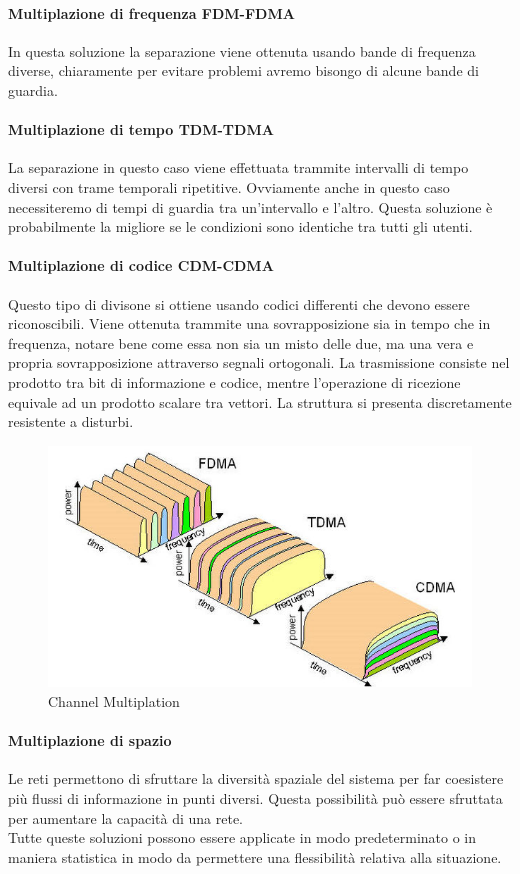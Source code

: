 \documentclass[12pt]{article}
\begin{document}
\paragraph{Multiplazione di frequenza FDM-FDMA}
In questa soluzione la separazione viene ottenuta usando bande di frequenza diverse, chiaramente per evitare problemi avremo bisongo di alcune bande di guardia.
\paragraph{Multiplazione di tempo TDM-TDMA}
La separazione in questo caso viene effettuata trammite intervalli di tempo diversi con trame temporali ripetitive. Ovviamente anche in questo caso necessiteremo di tempi di guardia tra un'intervallo e l'altro. Questa soluzione è probabilmente la migliore se le condizioni sono identiche tra tutti gli utenti.
\paragraph{Multiplazione di codice CDM-CDMA}
Questo tipo di divisone si ottiene usando codici differenti che devono essere riconoscibili. Viene ottenuta trammite una sovrapposizione sia in tempo che in frequenza, notare bene come essa non sia un misto delle due, ma una vera e propria sovrapposizione attraverso segnali ortogonali. La trasmissione consiste nel prodotto tra bit di informazione e codice, mentre l'operazione di ricezione equivale ad un prodotto scalare tra vettori. La struttura si presenta discretamente resistente a disturbi.\\
\begin{figure}[h!]
  \includegraphics[width=\linewidth]{images/csma.jpg}
  \caption{Channel Multiplation}
  \label{fig:cmult}
\end{figure}
\paragraph{Multiplazione di spazio}
Le reti permettono di sfruttare la diversità spaziale del sistema per far coesistere più flussi di informazione in punti diversi. Questa possibilità può essere sfruttata per aumentare la capacità di una rete.\\
Tutte queste soluzioni possono essere applicate in modo predeterminato o in maniera statistica in modo da permettere una flessibilità relativa alla situazione.
\end{document}
